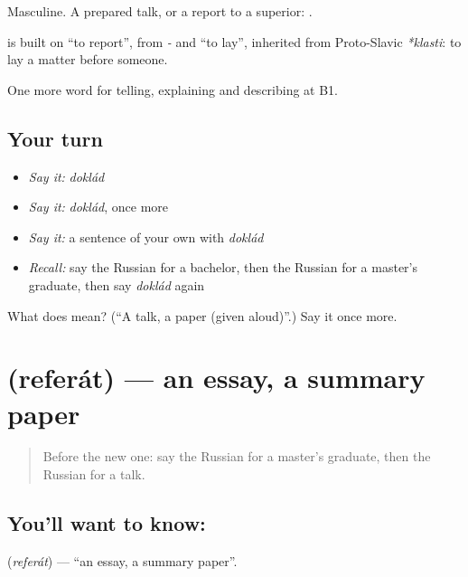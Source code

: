 Masculine. A prepared talk, or a report to a superior: \emph{ }.

\begin{cousinweb}
\textbf{} is built on \emph{} \textquotedblleft{}to report\textquotedblright{}, from \emph{-} and \emph{} \textquotedblleft{}to lay\textquotedblright{}, inherited from Proto-Slavic \emph{*klasti}: to lay a matter before someone.
\end{cousinweb}

\begin{grammarlens}[title={What you've built}]
One more word for telling, explaining and describing at B1.
\end{grammarlens}

\subsection*{Your turn}
\begin{itemize}
\raggedright
  \item \emph{Say it:} \emph{doklád}
  \item \emph{Say it:} \emph{doklád}, once more
  \item \emph{Say it:} a sentence of your own with \emph{doklád}
  \item \emph{Recall:} say the Russian for a bachelor, then the Russian for a master’s graduate, then say \emph{doklád} again
\end{itemize}

\begin{tcolorbox}[breakable,colback=teal!4,colframe=teal!35!black,title={Before you move on}]
What does  mean? (\textquotedblleft{}A talk, a paper (given aloud)\textquotedblright{}.) Say it once more.
\end{tcolorbox}
\section[\texorpdfstring{\ru{реферат} (referát)}{реферат (referát)}]{ (referát) — an essay, a summary paper}

\label{lesson:RU-C386-referat}



\begin{quote}
Before the new one: say the Russian for a master’s graduate, then the Russian for a talk.
\end{quote}

\subsection*{You'll want to know: }
\textbf{} (\emph{referát}) — \textquotedblleft{}an essay, a summary paper\textquotedblright{}.

